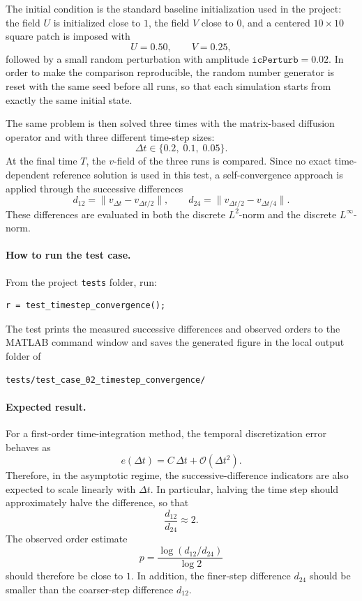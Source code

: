 The initial condition is the standard baseline initialization used in the project: the field \(U\) is initialized close to \(1\), the field \(V\) close to \(0\), and a centered \(10\times 10\) square patch is imposed with
\[
U = 0.50, \qquad V = 0.25,
\]
followed by a small random perturbation with amplitude \(\texttt{icPerturb}=0.02\). In order to make the comparison reproducible, the random number generator is reset with the same seed before all runs, so that each simulation starts from exactly the same initial state.

The same problem is then solved three times with the matrix-based diffusion operator and with three different time-step sizes:
\[
\Delta t \in \{0.2,\;0.1,\;0.05\}.
\]
At the final time \(T\), the \(v\)-field of the three runs is compared. Since no exact time-dependent reference solution is used in this test, a self-convergence approach is applied through the successive differences
\[
d_{12} = \|v_{\Delta t} - v_{\Delta t/2}\|,
\qquad
d_{24} = \|v_{\Delta t/2} - v_{\Delta t/4}\|.
\]
These differences are evaluated in both the discrete \(L^2\)-norm and the discrete \(L^\infty\)-norm.

\paragraph{How to run the test case.}
From the project \texttt{tests} folder, run:
\begin{verbatim}
r = test_timestep_convergence();
\end{verbatim}

The test prints the measured successive differences and observed orders to the MATLAB command window and saves the generated figure in the local output folder of
\begin{verbatim}
tests/test_case_02_timestep_convergence/
\end{verbatim}

\paragraph{Expected result.}
For a first-order time-integration method, the temporal discretization error behaves as
\[
e(\Delta t) = C\,\Delta t + \mathcal{O}(\Delta t^2).
\]
Therefore, in the asymptotic regime, the successive-difference indicators are also expected to scale linearly with \(\Delta t\). In particular, halving the time step should approximately halve the difference, so that
\[
\frac{d_{12}}{d_{24}} \approx 2.
\]
The observed order estimate
\[
p = \frac{\log(d_{12}/d_{24})}{\log 2}
\]
should therefore be close to \(1\). In addition, the finer-step difference \(d_{24}\) should be smaller than the coarser-step difference \(d_{12}\).

